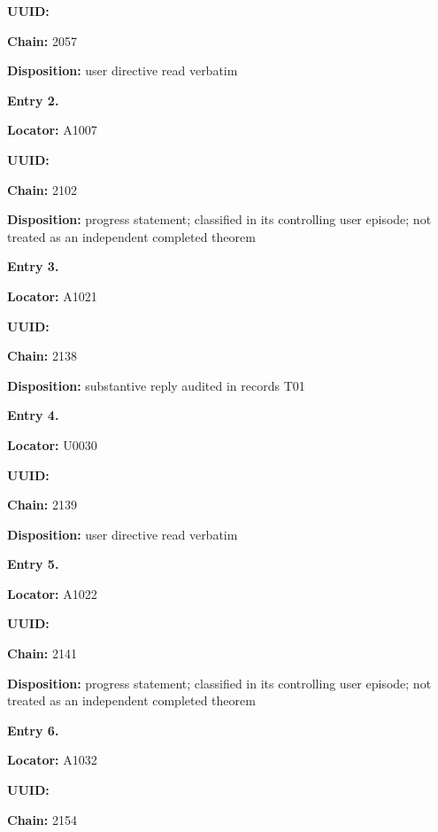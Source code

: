 \documentclass[10pt,a4paper,oneside]{report}
\begin{document}
\textbf{UUID:} \protect{}

\textbf{Chain:} 2057

\textbf{Disposition:} user directive read verbatim


\textbf{Entry 2.}

\textbf{Locator:} A1007

\textbf{UUID:} \protect{}

\textbf{Chain:} 2102

\textbf{Disposition:} progress statement; classified in its controlling
user episode; not treated as an independent completed theorem


\textbf{Entry 3.}

\textbf{Locator:} A1021

\textbf{UUID:} \protect{}

\textbf{Chain:} 2138

\textbf{Disposition:} substantive reply audited in records T01


\textbf{Entry 4.}

\textbf{Locator:} U0030

\textbf{UUID:} \protect{}

\textbf{Chain:} 2139

\textbf{Disposition:} user directive read verbatim


\textbf{Entry 5.}

\textbf{Locator:} A1022

\textbf{UUID:} \protect{}

\textbf{Chain:} 2141

\textbf{Disposition:} progress statement; classified in its controlling
user episode; not treated as an independent completed theorem


\textbf{Entry 6.}

\textbf{Locator:} A1032

\textbf{UUID:} \protect{}

\textbf{Chain:} 2154
\end{document}
